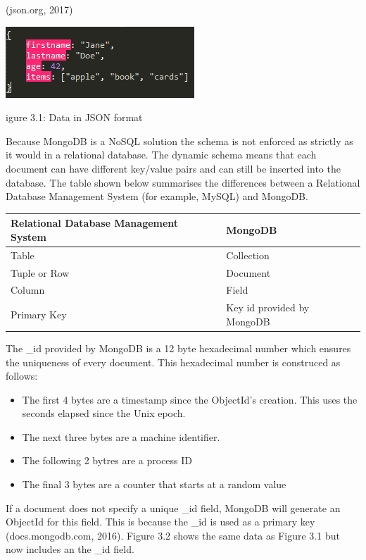 \documentclass[12pt]{article}
\begin{document}
(json.org, 2017)

\begin{center}
	\includegraphics[scale=1]{json_no_id.PNG}
	
	\caption Figure 3.1: Data in JSON format
\end{center}

Because MongoDB is a NoSQL solution the schema is not enforced as strictly as it would in a relational database. The dynamic schema means that each document can have different key/value pairs and can still be inserted into the database. The table shown below summarises the differences between a Relational Database Management System (for example, MySQL) and MongoDB.

\begin{center}
    \begin{tabular}{| l | l |}
    \hline
    Relational Database Management System & MongoDB  \\ \hline
    Table & Collection \\ \hline
    Tuple or Row & Document \\ \hline
    Column & Field \\ \hline
    Primary Key & Key id provided by MongoDB \\ \hline
    \end{tabular}
\end{center}

The {\_}id provided by MongoDB is a 12 byte hexadecimal number which ensures the uniqueness of every document. This hexadecimal number is construced as follows:

\begin{itemize}
	\item The first 4 bytes are a timestamp since the ObjectId's creation. This uses the seconds elapsed since the Unix epoch.
	\item The next three bytes are a machine identifier.
	\item The following 2 bytres are a process ID
	\item The final 3 bytes are a counter that starts at a random value
\end{itemize}

If a document does not specify a unique {\_}id field, MongoDB will generate an ObjectId for this field. This is because the {\_}id is used as a primary key (docs.mongodb.com, 2016). Figure 3.2 shows the same data as Figure 3.1 but now includes an the {\_}id field. 
\end{document}
